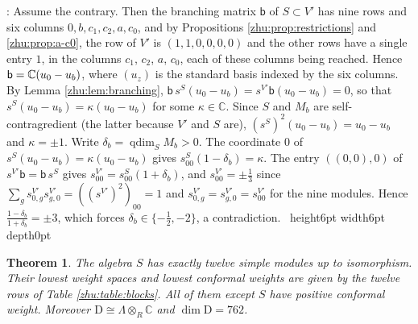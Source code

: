 \documentclass[leqno]{article}
\newcommand{\Cbb}{\ensuremath{\mathbb{C}}}
\newcommand{\D}{\mathrm{D}}
\newcommand{\qed}{\hfill \vrule height6pt  width6pt depth0pt}
\newcommand{\ot}{\otimes}
\let\ker\relax
\DeclareMathOperator{\ker}{Ker}
\newtheorem{thm}{Theorem}[section]
\newenvironment{proof}[1][]{\noindent {\it Proof #1} : }{\hbox{~}\qed
\smallskip
}
\numberwithin{equation}{section}
\begin{document}
\begin{proof}
Assume the contrary. Then the branching matrix $\mathsf b$ of $S \subset V'$ has nine rows and six columns $0, b, c_1, c_2, a, c_0$, and by Propositions \ref{zhu:prop:restrictions} and \ref{zhu:prop:a-c0}, the row of $V'$ is $(1,1,0,0,0,0)$ and the other rows have a single entry $1$, in the columns $c_1$, $c_2$, $a$, $c_0$, each of these columns being reached. Hence $\ker \mathsf b = \Cbb (u_0 - u_b)$, where $(u_z)$ is the standard basis indexed by the six columns. By Lemma \ref{zhu:lem:branching}, $\mathsf b\, s^S (u_0 - u_b) = s^{V'} \mathsf b (u_0 - u_b) = 0$, so that $s^S (u_0 - u_b) = \kappa (u_0 - u_b)$ for some $\kappa \in \Cbb$. Since $S$ and $M_b$ are self-contragredient (the latter because $V'$ and $S$ are), $(s^S)^2 (u_0 - u_b) = u_0 - u_b$ and $\kappa = \pm 1$. Write $\delta_b = \operatorname{qdim}_S M_b > 0$. The coordinate $0$ of $s^S (u_0 - u_b) = \kappa (u_0 - u_b)$ gives $s^S_{00}(1 - \delta_b) = \kappa$. The entry $((0,0),0)$ of $s^{V'} \mathsf b = \mathsf b\, s^S$ gives $s^{V'}_{00} = s^S_{00}(1 + \delta_b)$, and $s^{V'}_{00} = \pm \frac13$ since $\sum_g s^{V'}_{0,g}s^{V'}_{g,0} = ((s^{V'})^2)_{00} = 1$ and $s^{V'}_{0,g} = s^{V'}_{g,0} = s^{V'}_{00}$ for the nine modules. Hence $\frac{1 - \delta_b}{1 + \delta_b} = \pm 3$, which forces $\delta_b \in \{-\frac12, -2\}$, a contradiction.
\end{proof}

\begin{thm}
\label{zhu:thm:twelve}
The algebra $S$ has exactly twelve simple modules up to isomorphism. Their lowest weight spaces and lowest conformal weights are given by the twelve rows of Table \ref{zhu:table:blocks}. All of them except $S$ have positive conformal weight. Moreover $\D \cong \Lambda \ot_R \Cbb$ and $\dim \D = 762$.
\end{thm}
\end{document}
